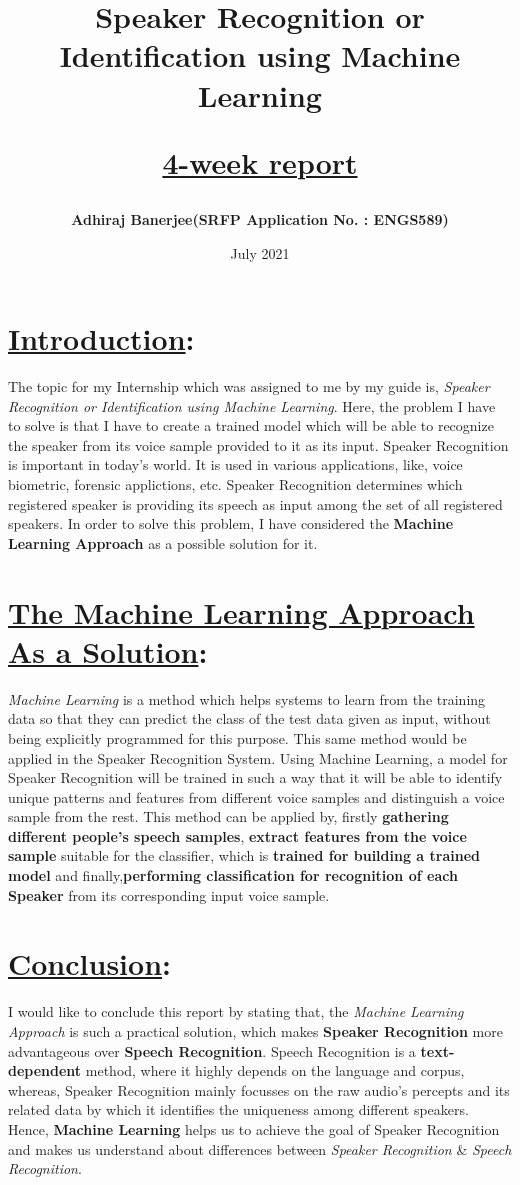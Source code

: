 \documentclass{article}
\title{\textbf{Speaker Recognition or Identification using Machine Learning}

\underline{\Large{4-week report}}}
\author{\textbf{Adhiraj Banerjee(SRFP Application No. : ENGS589)}}
\date{July 2021}
\begin{document}
\maketitle

\section{\textbf{\underline{Introduction}:}}
The topic for my Internship which was assigned to me by my guide is, \textit{Speaker Recognition or Identification using Machine Learning}. Here, the problem I have to solve is that I have to create a trained model which will be able to recognize the speaker from its voice sample provided to it as its input. Speaker Recognition is important in today's world. It is used in various applications, like, voice biometric, forensic applictions, etc. Speaker Recognition determines which registered speaker is providing its speech as input among the set of all registered speakers. In order to solve this problem, I have considered the \textbf{Machine Learning Approach} as a possible solution for it.

\section{\textbf{\underline{The Machine Learning Approach As a Solution}:}}
 \textit{Machine Learning} is a method which helps systems to learn from the training data so that they can predict the class of the test data given as input, without being explicitly programmed for this purpose. This same method would be applied in the Speaker Recognition System. Using Machine Learning, a model for Speaker Recognition will be trained in such a way that it will be able to identify unique patterns and features from different voice samples and distinguish a voice sample from the rest. This method can be applied by, firstly \textbf{gathering different people's speech samples}, \textbf{extract features from the voice sample} suitable for the classifier, which is \textbf{trained for building a trained model} and finally,\textbf{performing classification for recognition of each Speaker} from its corresponding input voice sample.

\section{\textbf{\underline{Conclusion}:}}
I would like to conclude this report by stating that, the \textit{Machine Learning Approach} is such a practical solution, which makes \textbf{Speaker Recognition} more advantageous over \textbf{Speech Recognition}. Speech Recognition is a \textbf{text-dependent} method, where it highly depends on the language and corpus, whereas, Speaker Recognition mainly focusses on the raw audio's percepts and its related data by which it identifies the uniqueness among different speakers. Hence, \textbf{Machine Learning} helps us to achieve the goal of Speaker Recognition and makes us understand about differences between \textit{Speaker Recognition} \& \textit{Speech Recognition}.
\end{document}
